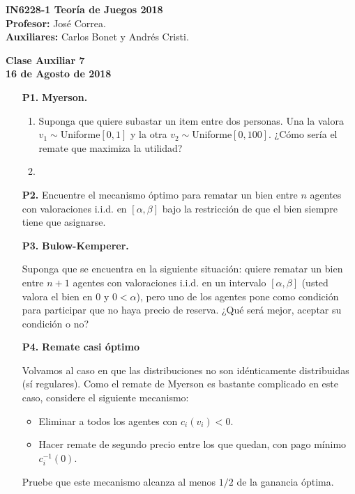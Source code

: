 \documentclass[11pt, spanish]{article}
\theoremstyle{plain}
\begin{document}

\begin{flushleft}
  \textbf{IN6228-1 Teoría de Juegos 2018}
  \\\textbf{Profesor:} José Correa.
  \\\textbf{Auxiliares:} Carlos Bonet y Andrés Cristi.
\end{flushleft}


\begin{center}
  \large{\textbf{Clase Auxiliar 7\\ 16 de Agosto de 2018}}
\end{center}




\begin{itemize}
\item[\textbf{P1.}] \textbf{Myerson.}
\begin{enumerate}
    \item Suponga que quiere subastar un item entre dos personas. Una la valora $v_1\sim$Uniforme$[0,1]$ y la otra
    $v_2\sim$Uniforme$[0,100]$. ¿Cómo sería el remate que maximiza
    la utilidad?
    \item 
\end{enumerate}



\item[\textbf{P2.}] Encuentre el mecanismo óptimo para rematar
un bien entre $n$ agentes con valoraciones i.i.d. en $[\alpha,\beta]$ bajo la restricción de que el bien siempre
tiene que asignarse.

\item[\textbf{P3.}] \textbf{Bulow-Kemperer.}

Suponga que se encuentra en la siguiente situación: quiere
rematar un bien entre $n+1$ agentes con valoraciones i.i.d.
en un intervalo $[\alpha,\beta]$ (usted valora el bien en 0 y
$0<\alpha$), pero uno de los agentes pone como condición para
participar que no haya precio de reserva. ¿Qué será mejor,
aceptar su condición o no?

\item[\textbf{P4.}] \textbf{Remate casi óptimo}

Volvamos al caso en que las distribuciones no son
idénticamente distribuidas (sí regulares). Como el remate
de Myerson es bastante complicado en este caso, considere
el siguiente mecanismo:
\begin{itemize}
    \item Eliminar a todos los agentes con $c_i(v_i)<0$.
    \item Hacer remate de segundo precio entre los que quedan,
    con pago mínimo $c_i^{-1}(0)$.
\end{itemize}
Pruebe que este mecanismo alcanza al menos $1/2$ de la
ganancia óptima.


	

\end{itemize}
\end{document}
